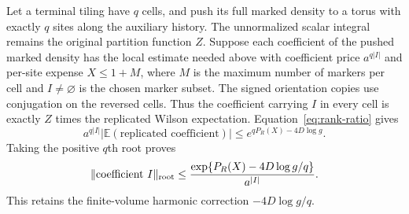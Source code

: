 Let a terminal tiling have $q$ cells, and push its full marked density
to a torus with exactly $q$ sites along the auxiliary history. The
unnormalized scalar integral remains the original partition function
$Z$. Suppose each coefficient of the pushed marked density has the
local estimate needed above with coefficient price $a^{q|I|}$ and
per-site expense $X\le1+M$, where $M$ is the maximum number of markers
per cell and $I\ne\varnothing$ is the chosen marker subset. The signed
orientation copies use conjugation on the reversed cells. Thus the
coefficient carrying $I$ in every cell is exactly $Z$ times the
replicated Wilson expectation. Equation~\eqref{eq:rank-ratio} gives
\[
 a^{q|I|}|\mathbb E(\text{replicated coefficient})|
       \le e^{qP_R(X)-4D\log g}.
\]
Taking the positive $q$th root proves
\begin{equation}\label{eq:rank-root}
 \|\text{coefficient }I\|_{\rm root}
 \le\frac{\exp\{P_R(X)-4D\log g/q\}}{a^{|I|}}.
\end{equation}
This retains the finite-volume harmonic correction $-4D\log g/q$.

